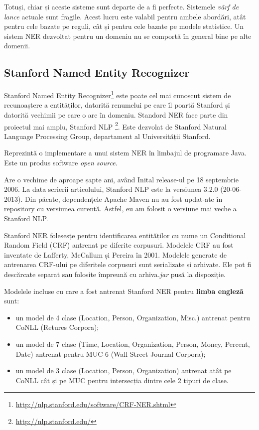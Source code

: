 Totuși, chiar și aceste sisteme sunt departe de a fi perfecte. Sistemele \textit{vârf de lance} actuale sunt fragile. Acest lucru este valabil pentru ambele abordări, atât pentru cele bazate pe reguli, cât și pentru cele bazate pe modele statistice. Un sistem NER dezvoltat pentru un domeniu nu se comportă în general bine pe alte domenii.

\subsection{Stanford Named Entity Recognizer}


Stanford Named Entity  Recognizer\footnote{\url{http://nlp.stanford.edu/software/CRF-NER.shtml}} este poate cel mai cunoscut sistem de recunoaștere a entităților, datorită renumelui pe care îl poartă Stanford și datorită vechimii pe care o are în domeniu. Standord NER face parte din proiectul mai amplu, Stanford NLP \footnote{\url{http://nlp.stanford.edu/}}. Este dezvolat de Stanford Natural Language Processing Group, departament al Universității Stanford. 

Reprezintă o implementare a unui sistem NER în limbajul de programare Java. Este un produs software \textit{open source}.

Are o vechime de aproape șapte ani, având Inital release-ul pe 18 septembrie 2006. La data scrierii articolului, Stanford NLP este la versiunea 3.2.0 (20-06-2013). Din păcate, dependențele Apache Maven nu au fost updat-ate în repository cu versiunea curentă. Astfel, eu am folosit o versiune mai veche a Stanford NLP.


Stanford NER folesesțe pentru identificarea entităților cu nume un Conditional Random Field (CRF) antrenat pe diferite corpusuri. Modelele CRF au fost inventate de Lafferty, McCallum și Pereira în 2001.\cite{Lafferty01conditionalrandom} Modelele generate de antrenarea CRF-ului pe diferitele corpusuri sunt serializate și arhivate. Ele pot fi descărcate separat sau folosite împreună cu arhiva\textit{.jar} pusă la dispoziție.


Modelele incluse cu care a fost antrenat Stanford NER pentru \textbf{limba engleză} sunt:

\begin{itemize}
\item un model de 4 clase (Location, Person, Organization, Misc.) antrenat pentru CoNLL (Retures Corpora);
\item un model de 7 clase (Time, Location, Organization, Person, Money, Percent, Date) antrenat pentru MUC-6 (Wall Street Journal Corpora);
\item un model de 3 clase  (Location, Person, Organization) antrenat atât pe CoNLL cât și pe MUC pentru intersecția dintre cele 2 tipuri de clase.
\end{itemize}

